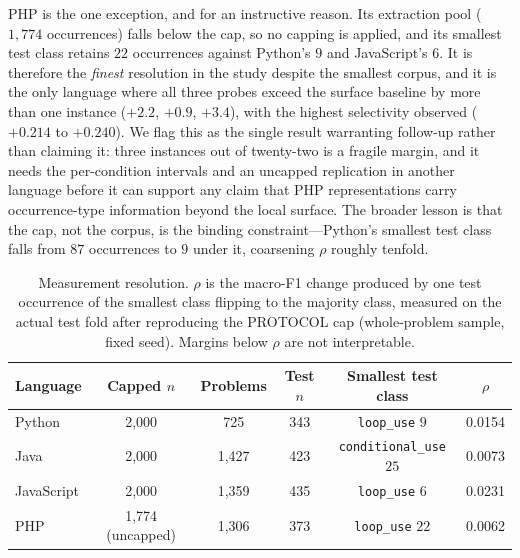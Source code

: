 PHP is the one exception, and for an instructive reason. Its extraction
pool ($1{,}774$ occurrences) falls below the cap, so no capping is
applied, and its smallest test class retains $22$ occurrences against
Python's $9$ and JavaScript's $6$. It is therefore the \emph{finest}
resolution in the study despite the smallest corpus, and it is the only
language where all three probes exceed the surface baseline by more than
one instance ($+2.2$, $+0.9$, $+3.4$), with the highest selectivity
observed ($+0.214$ to $+0.240$). We flag this as the single result
warranting follow-up rather than claiming it: three instances out of
twenty-two is a fragile margin, and it needs the per-condition intervals
and an uncapped replication in another language before it can support any
claim that PHP representations carry occurrence-type information beyond
the local surface. The broader lesson is that the cap, not the corpus, is
the binding constraint---Python's smallest test class falls from $87$
occurrences to $9$ under it, coarsening $\rho$ roughly tenfold.

\begin{table}[t]
\centering
\caption{Measurement resolution. $\rho$ is the macro-F1 change produced by
one test occurrence of the smallest class flipping to the majority class,
measured on the actual test fold after reproducing the PROTOCOL cap
(whole-problem sample, fixed seed). Margins below $\rho$ are not
interpretable.}
\label{tab:resolution}
\begin{tabular}{lccccc}
\toprule
Language & Capped $n$ & Problems & Test $n$ & Smallest test class & $\rho$ \\
\midrule
Python     & 2{,}000 & 725   & 343 & \texttt{loop\_use} $9$        & 0.0154 \\
Java       & 2{,}000 & 1{,}427 & 423 & \texttt{conditional\_use} $25$ & 0.0073 \\
JavaScript & 2{,}000 & 1{,}359 & 435 & \texttt{loop\_use} $6$        & 0.0231 \\
PHP        & 1{,}774 (uncapped) & 1{,}306 & 373 & \texttt{loop\_use} $22$ & 0.0062 \\
\bottomrule
\end{tabular}
\end{table}

